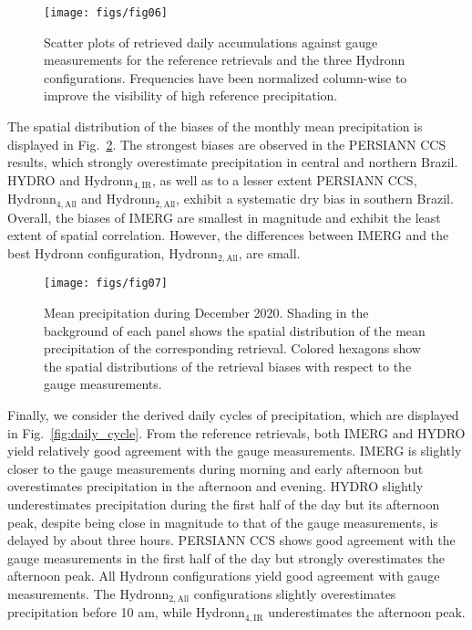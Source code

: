 \documentclass[journal abbreviation, manuscript]{copernicus}
\newcommand{\hydronntwo}{Hydronn$_{2, \text{All}}$}
\newcommand{\hydronnfourall}{Hydronn$_{4, \text{All}}$}
\newcommand{\hydronnfourir}{Hydronn$_{4, \text{IR}}$}
\begin{document}
\begin{figure}[hbpt!]
  \centering
  \texttt{[image: figs/fig06]}
  \caption{
    Scatter plots of retrieved daily accumulations against gauge measurements
    for the reference retrievals and the three Hydronn configurations.
    Frequencies have been normalized column-wise to improve the visibility of
    high reference precipitation.
  }
  \label{fig:daily_accumulations}
\end{figure}

The spatial distribution of the biases of the monthly mean precipitation is
displayed in Fig.~\ref{fig:mean_precipitation}. The strongest biases are
observed in the PERSIANN CCS results, which strongly overestimate precipitation
in central and northern Brazil. HYDRO and \hydronnfourir{}, as well as to a
lesser extent PERSIANN CCS, \hydronnfourall{} and \hydronntwo{}, exhibit a
systematic dry bias in southern Brazil. Overall, the biases of IMERG are
smallest in magnitude and exhibit the least extent of spatial correlation.
However, the differences between IMERG and the best Hydronn configuration,
\hydronntwo{}, are small.

\begin{figure}[hbpt!]
  \centering
  \texttt{[image: figs/fig07]}
  \caption{
    Mean precipitation during December 2020. Shading in the background of
    each panel shows the spatial distribution of the mean precipitation
    of the corresponding retrieval. Colored hexagons show the spatial
    distributions of the retrieval biases with respect to the gauge
    measurements.
    }
  \label{fig:mean_precipitation}
\end{figure}


Finally, we consider the derived daily cycles of precipitation, which are
displayed in Fig.~\ref{fig:daily_cycle}. From the reference retrievals, both
IMERG and HYDRO yield relatively good agreement with the gauge measurements.
IMERG is slightly closer to the gauge measurements during morning and early
afternoon but overestimates precipitation in the afternoon and evening. HYDRO
slightly underestimates precipitation during the first half of the day but its
afternoon peak, despite being close in magnitude to that of the gauge
measurements, is delayed by about three hours. PERSIANN CCS shows good agreement
with the gauge measurements in the first half of the day but strongly
overestimates the afternoon peak. All Hydronn configurations yield good
agreement with gauge measurements. The \hydronntwo{} configurations slightly
overestimates precipitation before 10 am, while \hydronnfourir{} underestimates
the afternoon peak.
\end{document}
